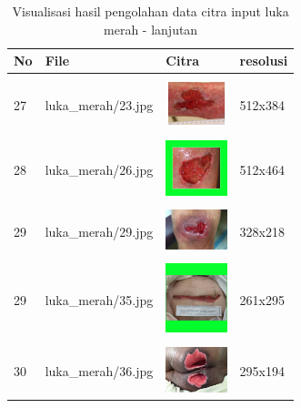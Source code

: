 \begin{table}[H]
	\centering
	\caption{Visualisasi hasil pengolahan data citra input luka merah - lanjutan}
	\label{tabel_input_12}
	\begin{tabular}{|m{0.2in}|m{1.2in}|m{0.7in}|m{0.7in}|}
		\hline
		\textbf{No} & \textbf{File} & \textbf{Citra} & \textbf{resolusi} \\
		\hline

		& &  &  \\
		27& 
		luka\_merah/23.jpg &
		\includegraphics[width=0.7in]{gambar/dataset_citra/luka_merah/bahan/23.jpg}&
		512x384\\
		\hline
		
		& &  &  \\
		28& 
		luka\_merah/26.jpg &
		\includegraphics[width=0.7in]{gambar/dataset_citra/luka_merah/bahan/26.jpg}&
		512x464\\
		\hline
		
		& &  &  \\
		29 & 
		luka\_merah/29.jpg &
		\includegraphics[width=0.7in]{gambar/dataset_citra/luka_merah/bahan/29.jpg}&
		328x218\\
		\hline
		
		& &  &  \\
		29& 
		luka\_merah/35.jpg &
		\includegraphics[width=0.7in]{gambar/dataset_citra/luka_merah/bahan/35.jpg}&
		261x295\\
		\hline
		
		& &  &  \\
		30& 
		luka\_merah/36.jpg &
		\includegraphics[width=0.7in]{gambar/dataset_citra/luka_merah/bahan/36.jpg}&
		295x194\\
		\hline
		

\end{tabular}
\end{table}
